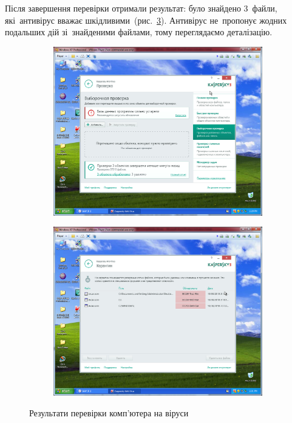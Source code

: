\documentclass[
	a4paper,
	oneside,
	DIV = 12,
	fontsize = 13pt,
	headings = normal,
]{scrartcl}
\begin{document}
		Після завершення перевірки отримали результат: було знайдено 3~файли, які~антивірус вважає шкідливими~(рис.~\ref{fig:kaspersky-scan-results}). Антивірус не~пропонує жодних подальших дій зі~знайденими файлами, тому переглядаємо деталізацію.

		\begin{figure}[!htbp]
			\centering
			\begin{subfigure}{0.5\textwidth}
				\centering
				\includegraphics[height = 9\baselineskip]{./assets/y03s01-pcdiag-lab-05-p11.PNG}
				\caption{}
				\label{subfig:kaspersky-scan-results-summary}
			\end{subfigure}%
			\begin{subfigure}{0.5\textwidth}
				\centering
				\includegraphics[height = 9\baselineskip]{./assets/y03s01-pcdiag-lab-05-p12.PNG}
				\caption{}
				\label{subfig:kaspersky-scan-results-details}
			\end{subfigure}%
			\caption{Результати перевірки комп'ютера на віруси}
			\label{fig:kaspersky-scan-results}
		\end{figure}
\end{document}
